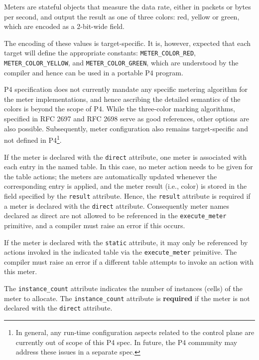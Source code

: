 \documentclass[12pt]{article}
\begin{document}
Meters are stateful objects that measure the data rate, either in 
packets or bytes per second, and output the result as one of three 
colors: red, yellow or green, which are encoded as a 2-bit-wide field.

The encoding of these values is target-specific. It is, however, 
expected that each target will define the appropriate constants: 
{\color{red}
\texttt{METER_COLOR_RED}, \texttt{METER_COLOR_YELLOW},
and \texttt{METER_COLOR_GREEN}, } which are understood by the compiler
and hence can be used in a portable P4 program.

P4 specification does not currently mandate any specific metering 
algorithm for the meter implementations, and hence ascribing the 
detailed semantics of the colors is beyond the scope of P4. While 
the three-color marking algorithms, specified in RFC 2697 and RFC 2698 
serve as good references, other options are also possible. Subsequently, 
meter configuration also remains target-specific and not defined 
in P4\footnote{In general, any run-time configuration aspects related 
to the control plane are currently out of scope of this P4 spec. In future, 
the P4 community may address these issues in a separate spec.}.

If the meter is declared with the \texttt{direct} attribute, one meter
is associated with each entry in the named table. In this case, no 
meter action needs to be given for the table actions; the meters are 
automatically updated whenever the corresponding entry is applied,
and the meter result (i.e., color) is stored in the field specified 
by the \texttt{result} attribute. Hence, the \texttt{result} attribute
is required if a meter is declared with the \texttt{direct} attribute.
Consequently meter names declared as direct are not allowed to be 
referenced in the \texttt{execute_meter} primitive, and a compiler must
raise an error if this occurs. 

If the meter is declared with the \texttt{static} attribute, it may only
be referenced by actions invoked in the indicated table via the \texttt{execute_meter}
primitive. The compiler must raise an error if a different table 
attempts to invoke an action with this meter.

The \texttt{instance_count} attribute indicates the number of
instances (cells) of the meter to allocate.  The
\texttt{instance_count} attribute is \textbf{required} if the meter
is not declared with the \texttt{direct} attribute.

\end{document}

